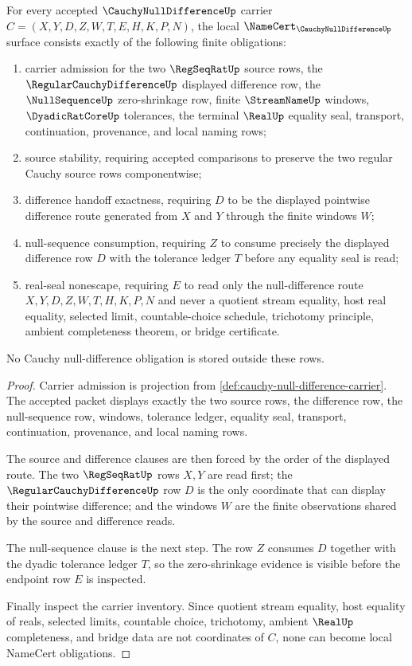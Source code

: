\begin{theorem}
\label{thm:cauchy-null-difference-namecert-obligations}
For every accepted $\CauchyNullDifferenceUp$ carrier $C=(X,Y,D,Z,W,T,E,H,K,P,N)$, the local $\NameCert_{\CauchyNullDifferenceUp}$ surface consists exactly of the following finite obligations:
\begin{enumerate}
\item carrier admission for the two $\RegSeqRatUp$ source rows, the $\RegularCauchyDifferenceUp$ displayed difference row, the $\NullSequenceUp$ zero-shrinkage row, finite $\StreamNameUp$ windows, $\DyadicRatCoreUp$ tolerances, the terminal $\RealUp$ equality seal, transport, continuation, provenance, and local naming rows;
\item source stability, requiring accepted comparisons to preserve the two regular Cauchy source rows componentwise;
\item difference handoff exactness, requiring $D$ to be the displayed pointwise difference route generated from $X$ and $Y$ through the finite windows $W$;
\item null-sequence consumption, requiring $Z$ to consume precisely the displayed difference row $D$ with the tolerance ledger $T$ before any equality seal is read;
\item real-seal nonescape, requiring $E$ to read only the null-difference route $X,Y,D,Z,W,T,H,K,P,N$ and never a quotient stream equality, host real equality, selected limit, countable-choice schedule, trichotomy principle, ambient completeness theorem, or bridge certificate.
\end{enumerate}
No Cauchy null-difference obligation is stored outside these rows.
\end{theorem}
\begin{proof}
Carrier admission is projection from \autoref{def:cauchy-null-difference-carrier}. The accepted packet displays exactly the two source rows, the difference row, the null-sequence row, windows, tolerance ledger, equality seal, transport, continuation, provenance, and local naming rows.

The source and difference clauses are then forced by the order of the displayed route. The two $\RegSeqRatUp$ rows $X,Y$ are read first; the $\RegularCauchyDifferenceUp$ row $D$ is the only coordinate that can display their pointwise difference; and the windows $W$ are the finite observations shared by the source and difference reads.

The null-sequence clause is the next step. The row $Z$ consumes $D$ together with the dyadic tolerance ledger $T$, so the zero-shrinkage evidence is visible before the endpoint row $E$ is inspected.

Finally inspect the carrier inventory. Since quotient stream equality, host equality of reals, selected limits, countable choice, trichotomy, ambient $\RealUp$ completeness, and bridge data are not coordinates of $C$, none can become local NameCert obligations.
\end{proof}

